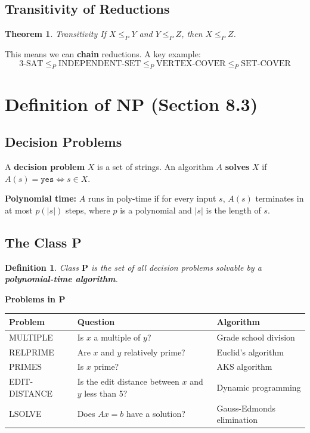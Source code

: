 \documentclass[12pt,a4paper]{report}
\newtheorem{definition}{Definition}
\newtheorem{theorem}{Theorem}
\begin{document}
\subsection{Transitivity of Reductions}

\begin{theorem}{Transitivity}{}
If $X \leq_P Y$ and $Y \leq_P Z$, then $X \leq_P Z$.
\end{theorem}

This means we can \textbf{chain} reductions. A key example:
\[
\text{3-SAT} \leq_P \text{INDEPENDENT-SET} \leq_P \text{VERTEX-COVER} \leq_P \text{SET-COVER}
\]

\section{Definition of NP (Section 8.3)}

\subsection{Decision Problems}

A \textbf{decision problem} $X$ is a set of strings. An algorithm $A$ \textbf{solves} $X$ if $A(s) = \texttt{yes} \iff s \in X$.

\textbf{Polynomial time:} $A$ runs in poly-time if for every input $s$, $A(s)$ terminates in at most $p(|s|)$ steps, where $p$ is a polynomial and $|s|$ is the length of $s$.

\subsection{The Class P}

\begin{definition}{Class }
$\mathbf{P}$ is the set of all decision problems solvable by a \textbf{polynomial-time algorithm}.
\end{definition}

 \textbf{Problems in P}{}
\begin{center}
\begin{tabular}{lll}
\toprule
Problem & Question & Algorithm \\
\midrule
MULTIPLE & Is $x$ a multiple of $y$? & Grade school division \\
RELPRIME & Are $x$ and $y$ relatively prime? & Euclid's algorithm \\
PRIMES & Is $x$ prime? & AKS algorithm  \\
EDIT-DISTANCE & Is the edit distance between $x$ and $y$ less than 5? & Dynamic programming \\
LSOLVE & Does $Ax = b$ have a solution? & Gauss-Edmonds elimination \\
\bottomrule
\end{tabular}
\end{center}
\end{document}
